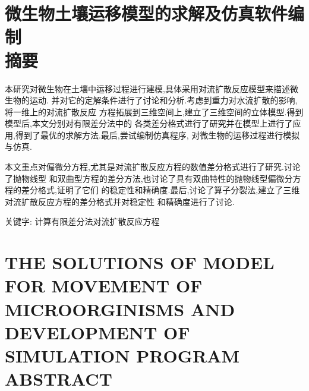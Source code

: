 
\chapter*{\heiti 微生物土壤运移模型的求解及仿真软件编制\\[1.5em]
摘\qquad 要}
本研究对微生物在土壤中运移过程进行建模,具体采用对流扩散反应模型来描述微生物的运动.
并对它的定解条件进行了讨论和分析.考虑到重力对水流扩散的影响,将一维上的对流扩散反应
方程拓展到三维空间上,建立了三维空间的立体模型.得到模型后,本文分别对有限差分法中的
各类差分格式进行了研究并在模型上进行了应用,得到了最优的求解方法.最后,尝试编制仿真程序,
对微生物的运移过程进行模拟与仿真.\par
本文重点对偏微分方程,尤其是对流扩散反应方程的数值差分格式进行了研究.讨论了抛物线型
和双曲型方程的差分方法,也讨论了具有双曲特性的抛物线型偏微分方程的差分格式,证明了它们
的稳定性和精确度.最后,讨论了算子分裂法,建立了三维对流扩散反应方程的差分格式并对稳定性
和精确度进行了讨论.\par
\vspace*{\baselineskip}
{\heiti 关键字: 计算\quad 有限差分法\quad 对流扩散反应方程}
\clearpage{\pagestyle{empty}\cleardoublepage}
\chapter*{\bfseries THE SOLUTIONS OF MODEL FOR MOVEMENT OF MICROORGINISMS AND DEVELOPMENT OF SIMULATION PROGRAM\\[2em]
ABSTRACT}

